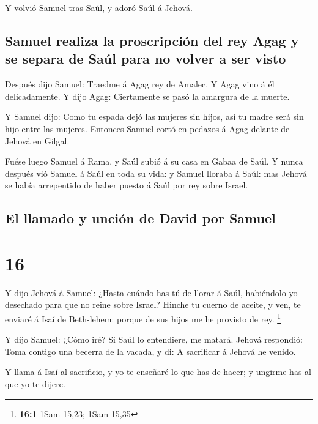  Y volvió Samuel tras Saúl, y adoró Saúl á Jehová.

\hypertarget{samuel-realiza-la-proscripciuxf3n-del-rey-agag-y-se-separa-de-sauxfal-para-no-volver-a-ser-visto}{%
\subsection{Samuel realiza la proscripción del rey Agag y se separa de
Saúl para no volver a ser
visto}\label{samuel-realiza-la-proscripciuxf3n-del-rey-agag-y-se-separa-de-sauxfal-para-no-volver-a-ser-visto}}

 Después dijo Samuel: Traedme á Agag rey de Amalec. Y
Agag vino á él delicadamente. Y dijo Agag: Ciertamente se pasó la
amargura de la muerte.

 Y Samuel dijo: Como tu espada dejó las mujeres sin
hijos, así tu madre será sin hijo entre las mujeres. Entonces Samuel
cortó en pedazos á Agag delante de Jehová en Gilgal.

 Fuése luego Samuel á Rama, y Saúl subió á su casa en
Gabaa de Saúl.  Y nunca después vió Samuel á Saúl en toda
su vida: y Samuel lloraba á Saúl: mas Jehová se había arrepentido de
haber puesto á Saúl por rey sobre Israel.

\hypertarget{el-llamado-y-unciuxf3n-de-david-por-samuel}{%
\subsection{El llamado y unción de David por
Samuel}\label{el-llamado-y-unciuxf3n-de-david-por-samuel}}

\hypertarget{section-15}{%
\section{16}\label{section-15}}

 Y dijo Jehová á Samuel: ¿Hasta cuándo has tú de llorar á
Saúl, habiéndolo yo desechado para que no reine sobre Israel? Hinche tu
cuerno de aceite, y ven, te enviaré á Isaí de Beth-lehem: porque de sus
hijos me he provisto de rey. \footnote{\textbf{16:1} 1Sam 15,23; 1Sam
  15,35}

 Y dijo Samuel: ¿Cómo iré? Si Saúl lo entendiere, me
matará. Jehová respondió: Toma contigo una becerra de la vacada, y di: A
sacrificar á Jehová he venido.

 Y llama á Isaí al sacrificio, y yo te enseñaré lo que has
de hacer; y ungirme has al que yo te dijere.

